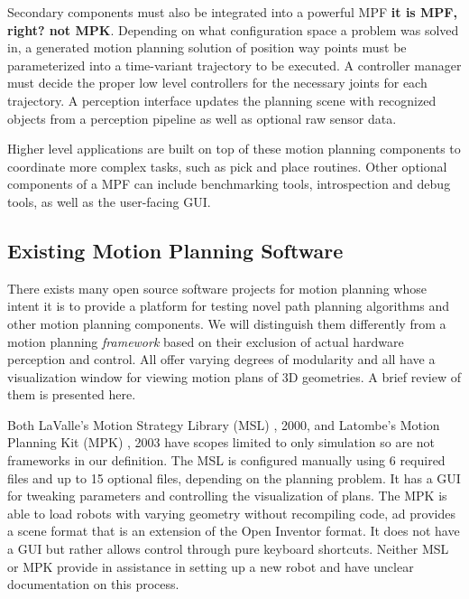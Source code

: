 \documentclass[10pt,journal,compsoc]{joser1}
\begin{document}
{Secondary components must also be integrated into a powerful MPF \textbf{it is MPF, right? not MPK}. Depending on what configuration space a problem was solved in, a generated motion planning solution of position way points must be parameterized into a time-variant trajectory to be executed. A controller manager must decide the proper low level controllers for the necessary joints for each trajectory. A perception interface updates the planning scene with recognized objects from a perception pipeline as well as optional raw sensor data.

Higher level applications are built on top of these motion planning components to coordinate more complex tasks, such as pick and place routines. Other optional components of a MPF can include benchmarking tools, introspection and debug tools, as well as the user-facing GUI.

\subsection{Existing Motion Planning Software}
\label{sec::existing}

There exists many open source software projects for motion planning whose intent it is to provide a platform for testing novel path planning algorithms and other motion planning components. We will distinguish them differently from a motion planning \textit{framework} based on their exclusion of actual hardware perception and control. All offer varying degrees of modularity and all have a visualization window for viewing motion plans of 3D geometries. A brief review of them is presented here.

Both LaValle's Motion Strategy Library (MSL) \cite{lavallemsl}, 2000, and Latombe's Motion Planning Kit (MPK) \cite{}, 2003 have scopes limited to only simulation so are not frameworks in our definition. The MSL is configured manually using 6 required files and up to 15 optional files, depending on the planning problem. It has a GUI for tweaking parameters and controlling the visualization of plans. The MPK is able to load robots with varying geometry without recompiling code, ad provides a scene format that is an extension of the Open Inventor format. It does not have a GUI but rather allows control through pure keyboard shortcuts. Neither MSL or MPK provide in assistance in setting up a new robot and have unclear documentation on this process.

}
\end{document}
